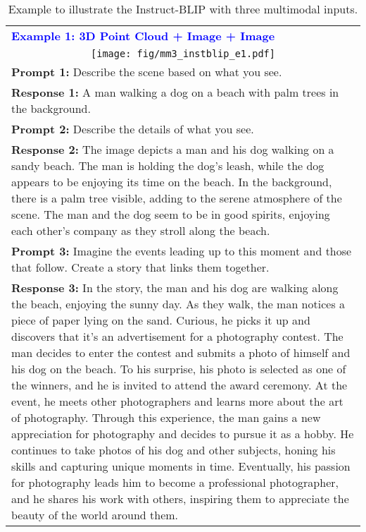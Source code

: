 \documentclass{article}
\newcommand{\methodname}{{\scshape Vit-lens}\xspace}
\begin{document}
\begin{table*}[h!]\centering
\begin{minipage}{1.0\columnwidth}\vspace{0mm}
\centering
\caption{Example to illustrate the Instruct-BLIP with three multimodal inputs.}
    \label{tab:example_mm3_insblip}
\begin{tcolorbox}[colback=white,colframe=blue!75!black,title={\bf InstructBLIP w/ \methodname, Three Multimodal Inputs.}]
    \centering
      \footnotesize
\begin{tabular}{p{} }
 \textcolor{blue}{ {\bf Example 1: 3D Point Cloud + Image + Image} } \\
 \multicolumn{1}{c}{\texttt{[image: fig/mm3\_instblip\_e1.pdf]}}  \\
{\bf Prompt 1:} Describe the scene based on what you see.  \\
{\bf Response 1:} A man walking a dog on a beach with palm trees in the background.  \\ 
{\bf Prompt 2:} Describe the details of what you see. \\
{\bf Response 2:} The image depicts a man and his dog walking on a sandy beach. The man is holding the dog's leash, while the dog appears to be enjoying its time on the beach. In the background, there is a palm tree visible, adding to the serene atmosphere of the scene. The man and the dog seem to be in good spirits, enjoying each other's company as they stroll along the beach.\\
{\bf Prompt 3:} Imagine the events leading up to this moment and those that follow. Create a story that links them together. \\
{\bf Response 3:} In the story, the man and his dog are walking along the beach, enjoying the sunny day. As they walk, the man notices a piece of paper lying on the sand. Curious, he picks it up and discovers that it's an advertisement for a photography contest. The man decides to enter the contest and submits a photo of himself and his dog on the beach. To his surprise, his photo is selected as one of the winners, and he is invited to attend the award ceremony. At the event, he meets other photographers and learns more about the art of photography. Through this experience, the man gains a new appreciation for photography and decides to pursue it as a hobby. He continues to take photos of his dog and other subjects, honing his skills and capturing unique moments in time. Eventually, his passion for photography leads him to become a professional photographer, and he shares his work with others, inspiring them to appreciate the beauty of the world around them. \\

\end{tabular}
\end{tcolorbox}
\end{minipage}
\end{table*}
\end{document}
